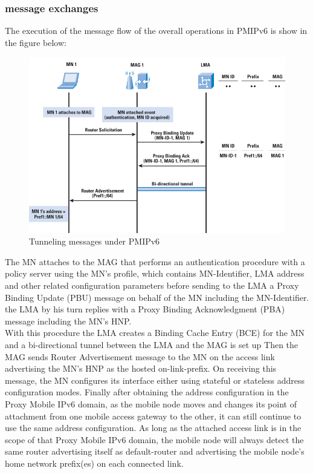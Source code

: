 \documentclass{article}
\begin{document}
\subsubsection{message exchanges}

The execution of the message flow of the overall operations in PMIPv6
is show in the figure below:

\begin{figure}[h!]
  \centering
    \includegraphics[scale=0.4]{reportPictures/figure4.jpg}
  \caption{Tunneling messages under PMIPv6}
\end{figure}

The MN attaches to the MAG that performs an authentication procedure
with a policy server using the MN's profile, which contains
MN-Identifier, LMA address and other related configuration parameters
before sending to the LMA a Proxy Binding Update (PBU) message on
behalf of the MN including the MN-Identifier. the LMA by his turn
replies with a Proxy Binding Acknowledgment (PBA) message including
the MN's HNP.\\
\newline
With this procedure the LMA creates a Binding Cache Entry (BCE) for
the MN and a bi-directional tunnel between the LMA and the MAG is set
up Then the MAG sends Router Advertisement message to the MN on the
access link advertising the MN's HNP as the hosted on-link-prefix. On
receiving this message, the MN configures its interface either using
stateful or stateless address configuration modes. Finally after
obtaining the address configuration in the Proxy Mobile IPv6 domain,
as the mobile node moves and changes its point of attachment from one
mobile access gateway to the other, it can still continue to use the
same address configuration.  As long as the attached access link is in
the scope of that Proxy Mobile IPv6 domain, the mobile node will
always detect the same router advertising itself as default-router and
advertising the mobile node's home network prefix(es) on each
connected link.
\end{document}
